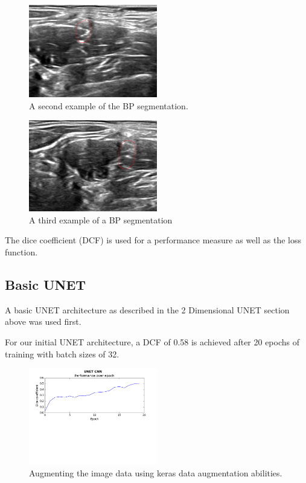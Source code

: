 \documentclass[letterpaper]{article}
\begin{document}
 \begin{figure}[H]
  \centerline{\includegraphics[width=0.5\textwidth]{Images/SegmentExample2.png}}
  \caption{A second example of the BP segmentation.}
  \label{fig:BPSegmentation2}
\end{figure}

 \begin{figure}[H]
  \centerline{\includegraphics[width=0.5\textwidth]{Images/SegmentExample3.png}}
  \caption{A third example of a BP segmentation}
  \label{fig:BPSegmentation3}
\end{figure}

The dice coefficient (DCF) is used for a performance measure as well as the loss function. 

\subsection{Basic UNET}
A basic UNET architecture as described in the 2 Dimensional UNET section above was used first. 

For our initial UNET architecture, a DCF of 0.58 is achieved after 20 epochs of training with batch sizes of 32. 

 \begin{figure}[H]
  \centerline{\includegraphics[width=0.5\textwidth]{Plots/UNETSimple20.png}}
  \caption{Augmenting the image data using keras data augmentation abilities.}
  \label{fig:unet3}
\end{figure}
\end{document}
